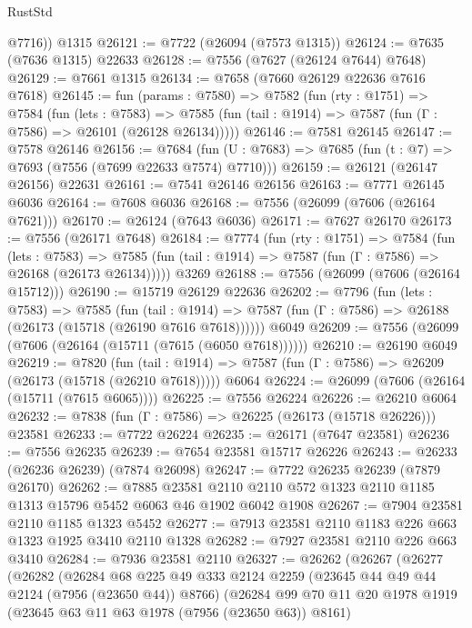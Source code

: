 \begin{lexlean}{RustStd}
\begin{coremodule}
{\begin{coremodule}
{{{{{{{{{{{{{{{{{{{{{{{{{{{{{{{{{{{{{{{{{{{        @7716))
    @1315
@26121 := @7722 (@26094 (@7573 @1315))
@26124 := @7635 (@7636 @1315) @22633
@26128 := @7556 (@7627 (@26124 @7644) @7648)
@26129 := @7661 @1315
@26134 := @7658 (@7660 @26129 @22636 @7616 @7618)
@26145 := fun (params : @7580) =>
  @7582
    (fun (rty : @1751) =>
    @7584
      (fun (lets : @7583) =>
      @7585 (fun (tail : @1914) => @7587 (fun (Γ : @7586) => @26101 (@26128 @26134)))))
@26146 := @7581 @26145
@26147 := @7578 @26146
@26156 := @7684
    (fun (U : @7683) => @7685 (fun (t : @7) => @7693 (@7556 (@7699 @22633 @7574) @7710)))
@26159 := @26121 (@26147 @26156) @22631
@26161 := @7541 @26146 @26156
@26163 := @7771 @26145 @6036
@26164 := @7608 @6036
@26168 := @7556 (@26099 (@7606 (@26164 @7621)))
@26170 := @26124 (@7643 @6036)
@26171 := @7627 @26170
@26173 := @7556 (@26171 @7648)
@26184 := @7774
    (fun (rty : @1751) =>
    @7584
      (fun (lets : @7583) =>
      @7585 (fun (tail : @1914) => @7587 (fun (Γ : @7586) => @26168 (@26173 @26134)))))
    @3269
@26188 := @7556 (@26099 (@7606 (@26164 @15712)))
@26190 := @15719 @26129 @22636
@26202 := @7796
    (fun (lets : @7583) =>
    @7585
      (fun (tail : @1914) =>
      @7587 (fun (Γ : @7586) => @26188 (@26173 (@15718 (@26190 @7616 @7618))))))
    @6049
@26209 := @7556 (@26099 (@7606 (@26164 (@15711 (@7615 (@6050 @7618))))))
@26210 := @26190 @6049
@26219 := @7820
    (fun (tail : @1914) => @7587 (fun (Γ : @7586) => @26209 (@26173 (@15718 (@26210 @7618)))))
    @6064
@26224 := @26099 (@7606 (@26164 (@15711 (@7615 @6065))))
@26225 := @7556 @26224
@26226 := @26210 @6064
@26232 := @7838 (fun (Γ : @7586) => @26225 (@26173 (@15718 @26226))) @23581
@26233 := @7722 @26224
@26235 := @26171 (@7647 @23581)
@26236 := @7556 @26235
@26239 := @7654 @23581 @15717 @26226
@26243 := @26233 (@26236 @26239) (@7874 @26098)
@26247 := @7722 @26235 @26239 (@7879 @26170)
@26262 := @7885
    @23581
    @2110
    @2110
    @572
    @1323
    @2110
    @1185
    @1313
    @15796
    @5452
    @6063
    @46
    @1902
    @6042
    @1908
@26267 := @7904 @23581 @2110 @1185 @1323 @5452
@26277 := @7913 @23581 @2110 @1183 @226 @663 @1323 @1925 @3410 @2110 @1328
@26282 := @7927 @23581 @2110 @226 @663 @3410
@26284 := @7936 @23581 @2110
@26327 := @26262
    (@26267
      (@26277
        (@26282
          (@26284
            @68
            @225
            @49
            @333
            @2124
            @2259
            (@23645 @44 @49 @44 @2124 (@7956 (@23650 @44)) @8766)
            (@26284
              @99
              @70
              @11
              @20
              @1978
              @1919
              (@23645 @63 @11 @63 @1978 (@7956 (@23650 @63)) @8161)
}}}}}}}}}}}}}}}}}}}}}}}}}}}}}}}}}}}}}}}}}}}
\end{coremodule}}
\end{coremodule}
\end{lexlean}
